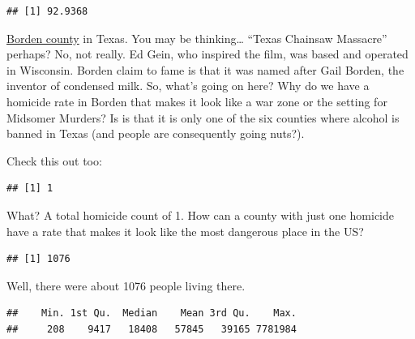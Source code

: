 \documentclass[]{book}
\newenvironment{Shaded}{\begin{snugshade}}{\end{snugshade}}
\newcommand{\KeywordTok}[1]{\textcolor[rgb]{0.13,0.29,0.53}{\textbf{#1}}}
\newcommand{\NormalTok}[1]{#1}
\newcommand{\OperatorTok}[1]{\textcolor[rgb]{0.81,0.36,0.00}{\textbf{#1}}}
\begin{document}
\begin{verbatim}
## [1] 92.9368
\end{verbatim}

\href{https://en.wikipedia.org/wiki/Borden_County,_Texas}{Borden county} in Texas. You may be thinking\ldots{} ``Texas Chainsaw Massacre'' perhaps? No, not really. Ed Gein, who inspired the film, was based and operated in Wisconsin. Borden claim to fame is that it was named after Gail Borden, the inventor of condensed milk. So, what's going on here? Why do we have a homicide rate in Borden that makes it look like a war zone or the setting for Midsomer Murders? Is is that it is only one of the six counties where alcohol is banned in Texas (and people are consequently going nuts?).

Check this out too:

\begin{Shaded}
\end{Shaded}

\begin{verbatim}
## [1] 1
\end{verbatim}

What? A total homicide count of 1. How can a county with just one homicide have a rate that makes it look like the most dangerous place in the US?

\begin{Shaded}
\end{Shaded}

\begin{verbatim}
## [1] 1076
\end{verbatim}

Well, there were about 1076 people living there.

\begin{Shaded}
\end{Shaded}

\begin{verbatim}
##    Min. 1st Qu.  Median    Mean 3rd Qu.    Max. 
##     208    9417   18408   57845   39165 7781984
\end{verbatim}
\end{document}
